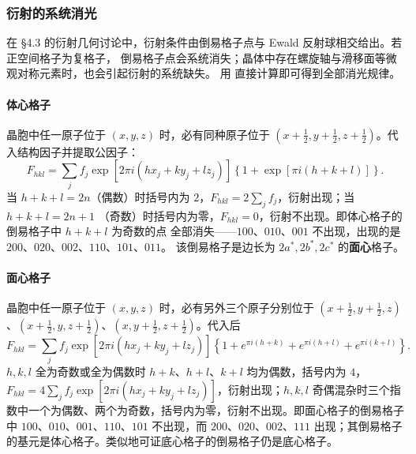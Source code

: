 \subsubsection{衍射的系统消光}

在 §4.3 的衍射几何讨论中，衍射条件由倒易格子点与 Ewald 反射球相交给出。若正空间格子为复格子，
倒易格子点会系统消失；晶体中存在螺旋轴与滑移面等微观对称元素时，也会引起衍射的系统缺失。
用 直接计算即可得到全部消光规律。

\paragraph{体心格子}晶胞中任一原子位于 $(x,y,z)$ 时，必有同种原子位于
$(x+\tfrac12,y+\tfrac12,z+\tfrac12)$。代入结构因子并提取公因子：
\begin{equation}
F_{hkl}=\sum_{j}f_{j}\exp\!\left[2\pi i(hx_{j}+ky_{j}+lz_{j})\right]
\left\{1+\exp\!\left[\pi i(h+k+l)\right]\right\}.
\label{eq:ch04b-I-extinct}
\end{equation}
当 $h+k+l=2n$（偶数）时括号内为 $2$，$F_{hkl}=2\sum_{j}f_{j}$，衍射出现；当 $h+k+l=2n+1$
（奇数）时括号内为零，$F_{hkl}=0$，衍射不出现。即体心格子的倒易格子中 $h+k+l$ 为奇数的点
全部消失——$100$、$010$、$001$ 不出现，出现的是 $200$、$020$、$002$、$110$、$101$、$011$。
该倒易格子是边长为 $2a^{*},2b^{*},2c^{*}$ 的\textbf{面心}格子。

\paragraph{面心格子}晶胞中任一原子位于 $(x,y,z)$ 时，必有另外三个原子分别位于
$(x+\tfrac12,y+\tfrac12,z)$、$(x+\tfrac12,y,z+\tfrac12)$、$(x,y+\tfrac12,z+\tfrac12)$。代入后
\begin{equation}
F_{hkl}=\sum_{j}f_{j}\exp\!\left[2\pi i(hx_{j}+ky_{j}+lz_{j})\right]
\left\{1+e^{\pi i(h+k)}+e^{\pi i(h+l)}+e^{\pi i(k+l)}\right\}.
\label{eq:ch04b-F-extinct}
\end{equation}
$h,k,l$ 全为奇数或全为偶数时 $h+k$、$h+l$、$k+l$ 均为偶数，括号内为 $4$，
$F_{hkl}=4\sum_{j}f_{j}\exp\!\left[2\pi i(hx_{j}+ky_{j}+lz_{j})\right]$，衍射出现；$h,k,l$
奇偶混杂时三个指数中一个为偶数、两个为奇数，括号内为零，衍射不出现。即面心格子的倒易格子
中 $100$、$010$、$001$、$110$、$101$ 不出现，而 $200$、$020$、$002$、$111$ 出现；其倒易格子
的基元是体心格子。类似地可证底心格子的倒易格子仍是底心格子。

